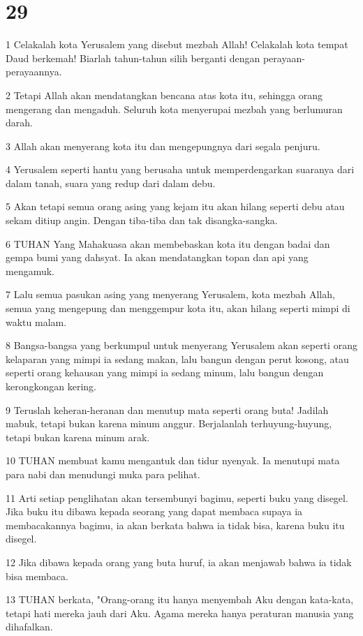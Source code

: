 \chapter{29}

\par 1 Celakalah kota Yerusalem yang disebut mezbah Allah! Celakalah kota tempat Daud berkemah! Biarlah tahun-tahun silih berganti dengan perayaan-perayaannya.
\par 2 Tetapi Allah akan mendatangkan bencana atas kota itu, sehingga orang mengerang dan mengaduh. Seluruh kota menyerupai mezbah yang berlumuran darah.
\par 3 Allah akan menyerang kota itu dan mengepungnya dari segala penjuru.
\par 4 Yerusalem seperti hantu yang berusaha untuk memperdengarkan suaranya dari dalam tanah, suara yang redup dari dalam debu.
\par 5 Akan tetapi semua orang asing yang kejam itu akan hilang seperti debu atau sekam ditiup angin. Dengan tiba-tiba dan tak disangka-sangka.
\par 6 TUHAN Yang Mahakuasa akan membebaskan kota itu dengan badai dan gempa bumi yang dahsyat. Ia akan mendatangkan topan dan api yang mengamuk.
\par 7 Lalu semua pasukan asing yang menyerang Yerusalem, kota mezbah Allah, semua yang mengepung dan menggempur kota itu, akan hilang seperti mimpi di waktu malam.
\par 8 Bangsa-bangsa yang berkumpul untuk menyerang Yerusalem akan seperti orang kelaparan yang mimpi ia sedang makan, lalu bangun dengan perut kosong, atau seperti orang kehausan yang mimpi ia sedang minum, lalu bangun dengan kerongkongan kering.
\par 9 Teruslah keheran-heranan dan menutup mata seperti orang buta! Jadilah mabuk, tetapi bukan karena minum anggur. Berjalanlah terhuyung-huyung, tetapi bukan karena minum arak.
\par 10 TUHAN membuat kamu mengantuk dan tidur nyenyak. Ia menutupi mata para nabi dan menudungi muka para pelihat.
\par 11 Arti setiap penglihatan akan tersembunyi bagimu, seperti buku yang disegel. Jika buku itu dibawa kepada seorang yang dapat membaca supaya ia membacakannya bagimu, ia akan berkata bahwa ia tidak bisa, karena buku itu disegel.
\par 12 Jika dibawa kepada orang yang buta huruf, ia akan menjawab bahwa ia tidak bisa membaca.
\par 13 TUHAN berkata, "Orang-orang itu hanya menyembah Aku dengan kata-kata, tetapi hati mereka jauh dari Aku. Agama mereka hanya peraturan manusia yang dihafalkan.
